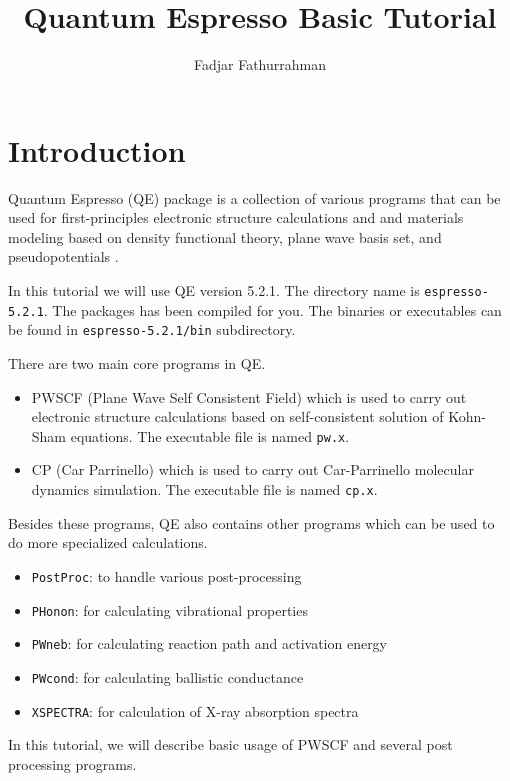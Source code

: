 \documentclass[12pt,english]{paper}
\begin{document}
\title{Quantum Espresso Basic Tutorial}


\author{Fadjar Fathurrahman}

\maketitle

\section{Introduction}

Quantum Espresso (QE) package is a collection of various programs
that can be used for first-principles electronic structure calculations
and and materials modeling based on density functional theory, plane
wave basis set, and pseudopotentials \cite{Giannozzi2009}.

In this tutorial we will use QE version 5.2.1. The directory name
is \texttt{espresso-5.2.1}. The packages has been compiled for you.
The binaries or executables can be found in \texttt{espresso-5.2.1/bin}
subdirectory.

There are two main core programs in QE.
\begin{itemize}
\item PWSCF (Plane Wave Self Consistent Field) which is used to carry out
electronic structure calculations based on self-consistent solution
of Kohn-Sham equations. The executable file is named \texttt{pw.x}.
\item CP (Car Parrinello) which is used to carry out Car-Parrinello molecular
dynamics simulation. The executable file is named \texttt{cp.x}.
\end{itemize}
Besides these programs, QE also contains other programs which can
be used to do more specialized calculations.
\begin{itemize}
\item \texttt{PostProc}: to handle various post-processing
\item \texttt{PHonon}: for calculating vibrational properties
\item \texttt{PWneb}: for calculating reaction path and activation energy
\item \texttt{PWcond}: for calculating ballistic conductance
\item \texttt{XSPECTRA}: for calculation of X-ray absorption spectra
\end{itemize}
In this tutorial, we will describe basic usage of PWSCF and several
post processing programs.
\end{document}
